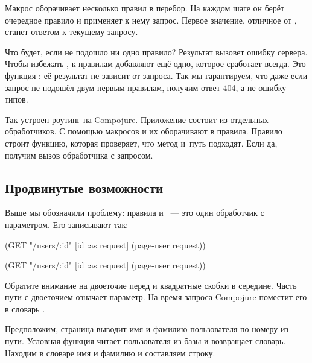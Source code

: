 
Макрос  оборачивает несколько правил в перебор. На каждом шаге
он берёт очередное правило и применяет к нему запрос. Первое значение, отличное
от , станет ответом к текущему запросу.

Что будет, если не подошло ни одно правило? Результат  вызовет ошибку
сервера. Чтобы избежать , к правилам добавляют ещё одно, которое
сработает всегда. Это функция : её результат не зависит от
запроса. Так мы гарантируем, что даже если запрос не подошёл двум первым
правилам, получим ответ 404, а не ошибку типов.

Так устроен роутинг на Compojure. Приложение состоит из отдельных
обработчиков. С помощью макросов  и  их оборачивают в
правила. Правило строит функцию, которая проверяет, что метод и~путь
подходят. Если да, получим вызов обработчика с запросом.

\subsection{Продвинутые возможности}

Выше мы обозначили проблему: правила  и ~---
это один обработчик с параметром. Его записывают так:


\ifnarrow

\begin{clojure}
(GET "/users/:id" [id :as request]
    (page-user request))
\end{clojure}

\else

\begin{clojure}
(GET "/users/:id" [id :as request] (page-user request))
\end{clojure}

\fi

Обратите внимание на двоеточие перед  и квадратные скобки в середине.
Часть пути с двоеточием означает параметр. На время запроса Compojure поместит
его в словарь .

Предположим, страница  выводит имя и фамилию пользователя по
номеру из пути. Условная функция  читает пользователя из
базы и возвращает словарь. Находим в словаре имя и фамилию и составляем строку.

\ifnarrow

